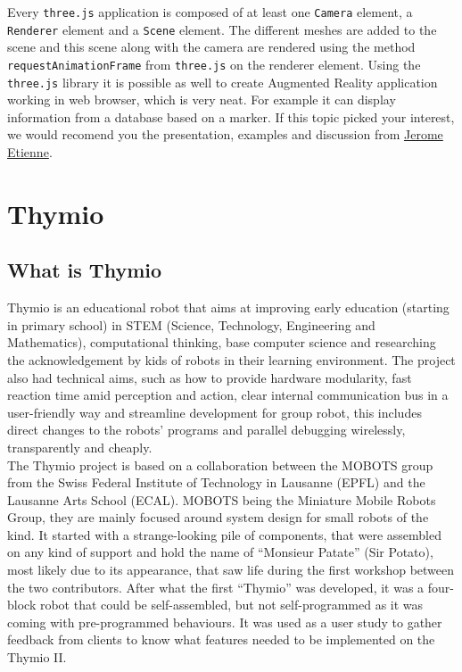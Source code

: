 \documentclass{scrbook}
\begin{document}
Every \texttt{three.js} application is composed of at least one \texttt{Camera} element, a \texttt{Renderer} element and a \texttt{Scene} element. The different meshes are added to the scene and this scene along with the camera are rendered using the method 
\texttt{requestAnimationFrame} from \texttt{three.js} on the renderer element. 
Using the \texttt{three.js} library it is possible as well to create Augmented Reality application working in web browser, which is very neat. For example it can display information from a database based on a marker. If this topic picked your interest, 
we would recomend you the presentation, examples and discussion from \href{http://jeromeetienne.github.io/slides/augmentedrealitywiththreejs/}{Jerome Etienne}.

\chapter{Thymio}
\section{What is Thymio} 

Thymio is an educational robot that aims at improving early education (starting in primary school) in STEM (Science, Technology, Engineering and Mathematics),
computational thinking, base computer science and researching the acknowledgement by kids of robots in their learning environment.
The project also had technical aims, such as how to provide hardware modularity, fast reaction time amid perception and action,
clear internal communication bus in a user-friendly way and streamline development for group robot, this includes direct changes to the robots’ programs and parallel debugging wirelessly, 
transparently and cheaply.\\

The Thymio project is based on a collaboration between the MOBOTS group from the Swiss Federal Institute of Technology in Lausanne (EPFL) and the Lausanne Arts School (ECAL).
MOBOTS being the Miniature Mobile Robots Group, they are mainly focused around system design for small robots of the kind. It started with a strange-looking pile of components, 
that were assembled on any kind of support and hold the name of “Monsieur Patate” (Sir Potato), most likely due to its appearance, 
that saw life during the first workshop between the two contributors. After what the first “Thymio” was developed, 
it was a four-block robot that could be self-assembled, but not self-programmed as it was coming with pre-programmed behaviours. 
It was used as a user study to gather feedback from clients to know what features needed to be implemented on the Thymio II.\\
\end{document}
